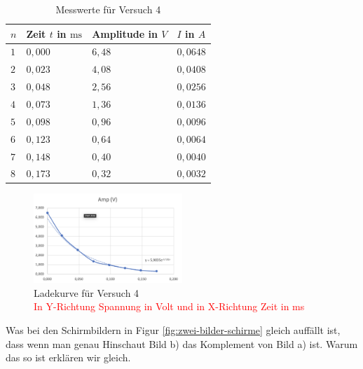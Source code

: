         \begin{table}[h!]
            \centering
            \begin{tabular}{|l|l|l|l|}
                \hline
                $n$ & Zeit $t$ in $\mathrm{ms}$ & Amplitude in $V$ & $I$ in $A$\\
                \hline\hline
                $1$ & $0,000$ & $6,48$ & $0,0648$\\
                \hline
                $2$ & $0,023$ & $4,08$ & $0,0408$\\
                \hline
                $3$ & $0,048$ & $2,56$ & $0,0256$\\
                \hline
                $4$ & $0,073$ & $1,36$ & $0,0136$\\
                \hline
                $5$ & $0,098$ & $0,96$ & $0,0096$\\
                \hline
                $6$ & $0,123$ & $0,64$ & $0,0064$\\
                \hline
                $7$ & $0,148$ & $0,40$ & $0,0040$\\
                \hline
                $8$ & $0,173$ & $0,32$ & $0,0032$\\
                \hline
            \end{tabular}
            \caption{Messwerte für Versuch 4}
            \label{tab:versuch4}
        \end{table}

        \begin{figure}[h!]
            \centering
            \includegraphics[width=0.5\textwidth]{bilder/Physik_05.png}
            \caption{Ladekurve für Versuch 4 \\ \textcolor{red}{In Y-Richtung Spannung in Volt und in X-Richtung Zeit in ms}}
            \label{fig:versuch4}
        \end{figure}

       Was bei den Schirmbildern in Figur \ref{fig:zwei-bilder-schirme} gleich auffällt ist, dass wenn man genau Hinschaut Bild b) das Komplement von Bild a) ist. Warum das so ist erklären wir gleich. 
       
